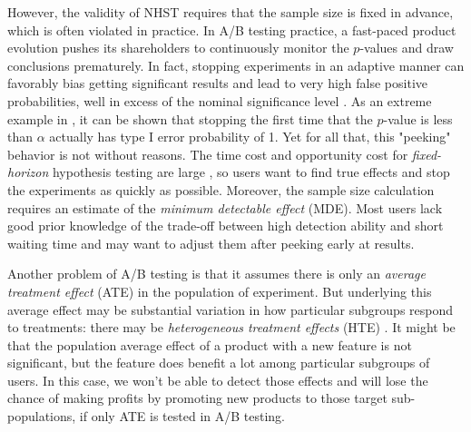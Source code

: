 \documentclass[letterpaper]{article}
\newcommand{\citep}{\cite}
\begin{document}
However, the validity of NHST requires that the sample size is fixed in advance, which is often violated in practice. In A/B testing practice, a fast-paced product evolution pushes its shareholders to continuously monitor the $p$-values and draw conclusions prematurely. In fact, stopping experiments in an adaptive manner can favorably bias getting significant results and lead to very high false positive probabilities, well in excess of the nominal significance level \citep{goodson2014most,simmons2011false}. As an extreme example in \citep{pekelis2015new}, it can be shown that stopping the first time that the $p$-value is less than $\alpha$ actually has type I error probability of 1. Yet for all that, this "peeking" behavior is not without reasons. The time cost and opportunity cost for \textit{fixed-horizon} hypothesis testing are large \citep{ju2019sequential}, so users want to find true effects and stop the experiments as quickly as possible. Moreover, the sample size calculation requires an estimate of the \textit{minimum detectable effect} (MDE). Most users lack good prior knowledge of the trade-off between high detection ability and short waiting time and may want to adjust them after peeking early at results.

Another problem of A/B testing is that it assumes there is only an \textit{average treatment effect} (ATE) in the population of experiment. But underlying this average effect may be substantial variation in how particular subgroups respond to treatments: there may be \textit{heterogeneous treatment effects} (HTE) \citep{grimmer2017estimating}. It might be that the population average effect of a product with a new feature is not significant, but the feature does benefit a lot among particular subgroups of users. In this case, we won't be able to detect those effects and will lose the chance of making profits by promoting new products to those target sub-populations, if only ATE is tested in A/B testing.
\end{document}
